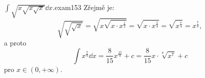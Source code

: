 \begin{mathexam}{\(\int\sqrt{x\sqrt{x\sqrt{x}}}\dd{x}.\)}{exam153} 
  Zřejmě je: 
  \[
    \sqrt{\sqrt{\sqrt{x}}} = \sqrt{{x}\sqrt{x\cdot x^{\frac{1}{2}}}} = \sqrt{x\cdot x^{\frac{3}{4}}}
      = \sqrt{x^\frac{7}{4}} = x^{\frac{7}{8}},
  \]
  a proto
  \[
    \int x^{\frac{7}{8}}\dd{x} = \frac{8}{15}x^{\frac{15}{8}} + c 
      = \frac{8}{15}x\cdot\sqrt[8]{x^7} + c
  \]
  pro \(x\in(0,+\infty)\).
\end{mathexam}